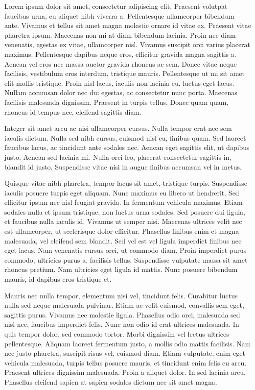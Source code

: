 \documentclass[11pt,a4paper]{book}
\begin{document}
Lorem ipsum dolor sit amet, consectetur adipiscing elit. Praesent volutpat faucibus urna, eu aliquet nibh viverra a. Pellentesque ullamcorper bibendum ante. Vivamus et tellus sit amet magna molestie ornare id vitae ex. Praesent vitae pharetra ipsum. Maecenas non mi at diam bibendum lacinia. Proin nec diam venenatis, egestas ex vitae, ullamcorper nisl. Vivamus suscipit orci varius placerat maximus. Pellentesque dapibus neque eros, efficitur gravida magna sagittis a. Aenean vel eros nec massa auctor gravida rhoncus ac sem. Donec vitae neque facilisis, vestibulum eros interdum, tristique mauris. Pellentesque ut mi sit amet elit mollis tristique. Proin nisl lacus, iaculis non lacinia eu, luctus eget lacus. Nullam accumsan dolor nec dui egestas, ac consectetur nunc porta. Maecenas facilisis malesuada dignissim. Praesent in turpis tellus. Donec quam quam, rhoncus id tempus nec, eleifend sagittis diam.

Integer sit amet arcu ac nisi ullamcorper cursus. Nulla tempor erat nec sem iaculis dictum. Nulla sed nibh cursus, euismod nisl eu, finibus quam. Sed laoreet faucibus lacus, ac tincidunt ante sodales nec. Aenean eget sagittis elit, ut dapibus justo. Aenean sed lacinia mi. Nulla orci leo, placerat consectetur sagittis in, blandit id justo. Suspendisse vitae nisi in augue finibus accumsan vel in metus.

Quisque vitae nibh pharetra, tempor lacus sit amet, tristique turpis. Suspendisse iaculis posuere turpis eget aliquam. Nunc maximus eu libero ut hendrerit. Sed efficitur ipsum nec nisl feugiat gravida. In fermentum vehicula maximus. Etiam sodales nulla et ipsum tristique, non luctus urna sodales. Sed posuere dui ligula, et faucibus nulla iaculis id. Vivamus ut semper nisi. Maecenas ultrices velit nec est ullamcorper, ut scelerisque dolor efficitur. Phasellus finibus enim et magna malesuada, vel eleifend sem blandit. Sed vel est vel ligula imperdiet finibus nec eget lacus. Nam venenatis cursus orci, ut commodo diam. Proin imperdiet purus commodo, ultricies purus a, facilisis tellus. Suspendisse vulputate massa sit amet rhoncus pretium. Nam ultricies eget ligula id mattis. Nunc posuere bibendum mauris, id dapibus eros tristique et.

Mauris nec nulla tempor, elementum nisi vel, tincidunt felis. Curabitur luctus nulla sed neque malesuada pulvinar. Etiam ac velit euismod, convallis sem eget, sagittis purus. Vivamus nec molestie ligula. Phasellus odio orci, malesuada sed nisl nec, faucibus imperdiet felis. Nunc non odio id erat ultrices malesuada. In quis tempor dolor, sed commodo tortor. Morbi dignissim vel lectus ultrices pellentesque. Aliquam laoreet fermentum justo, a mollis odio mattis facilisis. Nam nec justo pharetra, suscipit risus vel, euismod diam. Etiam vulputate, enim eget vehicula malesuada, turpis tellus posuere mauris, et tincidunt enim felis eu arcu. Praesent ultrices dignissim malesuada. Proin a aliquet dolor. In sed lacinia arcu. Phasellus eleifend sapien at sapien sodales dictum nec sit amet magna.
\end{document}
